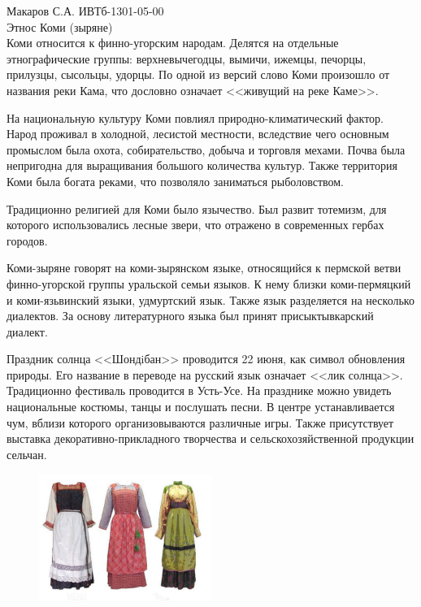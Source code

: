 \documentclass[a4paper,14pt]{extarticle}
\begin{document}
	\pagestyle{empty}
	\noindent Макаров С.А. ИВТб-1301-05-00\\
	Этнос Коми (зыряне)\\
	
	Коми относится к финно-угорским народам. Делятся на отдельные этнографические группы: верхневычегодцы, вымичи, ижемцы, печорцы, прилузцы, сысольцы, удорцы. По одной из версий слово Коми произошло от названия реки Кама, что дословно означает <<живущий на реке Каме>>.
	
	\indent На национальную культуру Коми повлиял природно-климатический фактор. Народ проживал в холодной, лесистой местности, вследствие чего основным промыслом была охота, собирательство, добыча и торговля мехами. Почва была непригодна для выращивания большого количества культур. Также территория Коми была богата реками, что позволяло заниматься рыболовством.
	
	\indent Традиционно религией для Коми было язычество. Был развит тотемизм, для которого использовались лесные звери, что отражено в современных гербах городов.
	
	\indent Коми-зыряне говорят на коми-зырянском языке, относящийся к пермской ветви финно-угорской группы уральской семьи языков. К нему близки коми-пермяцкий и коми-язьвинский языки, удмуртский язык. Также язык разделяется на несколько диалектов. За основу литературного языка был принят присыктывкарский диалект.
	
	\indent Праздник солнца <<Шондiбан>> проводится 22 июня, как символ обновления природы. Его название в переводе на русский язык означает <<лик солнца>>. Традиционно фестиваль проводится в Усть-Усе. На празднике можно увидеть национальные костюмы, танцы и послушать песни. В центре устанавливается чум, вблизи которого организовываются различные игры. Также присутствует выставка декоративно-прикладного творчества и сельскохозяйственной продукции сельчан.\\

	\begin{figure}
		\centering
		\includegraphics[width=0.5\textwidth]{images/f}
	\end{figure}
	
\end{document}
